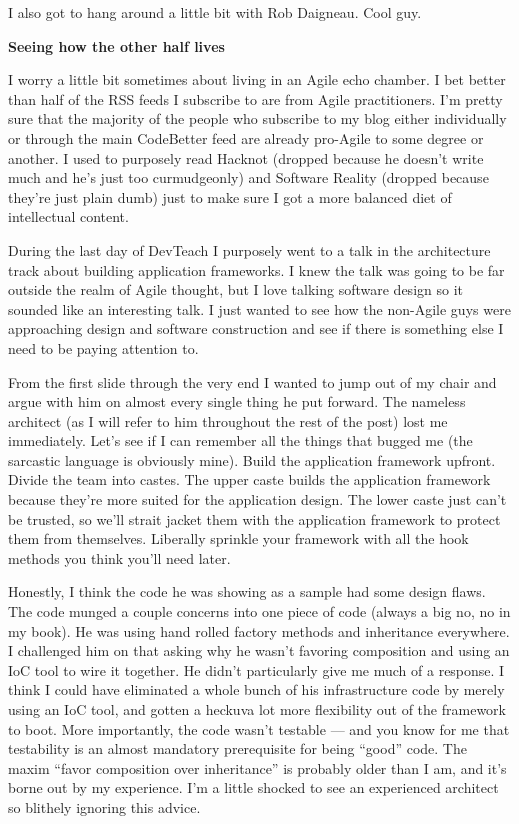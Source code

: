 \documentclass{article}
\begin{document}
I also got to hang around a little bit with Rob Daigneau.  Cool guy.

 
\Large {\textbf {Seeing how the other half lives}}

I worry a little bit sometimes about living in an Agile echo chamber.  I bet better than half of the RSS feeds I subscribe to are from Agile practitioners.  I'm pretty sure that the majority of the people who subscribe to my blog either individually or through the main CodeBetter feed are already pro-Agile to some degree or another.  I used to purposely read Hacknot (dropped because he doesn't write much and he's just too curmudgeonly) and Software Reality (dropped because they're just plain dumb) just to make sure I got a more balanced diet of intellectual content. 

During the last day of DevTeach I purposely went to a talk in the architecture track about building application frameworks.  I knew the talk was going to be far outside the realm of Agile thought, but I love talking software design so it sounded like an interesting talk.  I just wanted to see how the non-Agile guys were approaching design and software construction and see if there is something else I need to be paying attention to. 

From the first slide through the very end I wanted to jump out of my chair and argue with him on almost every single thing he put forward.  The nameless architect (as I will refer to him throughout the rest of the post) lost me immediately.  Let's see if I can remember all the things that bugged me (the sarcastic language is obviously mine).  Build the application framework upfront.  Divide the team into castes.  The upper caste builds the application framework because they're more suited for the application design.  The lower caste just can't be trusted, so we'll strait jacket them with the application framework to protect them from themselves.  Liberally sprinkle your framework with all the hook methods you think you'll need later. 

Honestly, I think the code he was showing as a sample had some design flaws.  The code munged a couple concerns into one piece of code (always a big no, no in my book).  He was using hand rolled factory methods and inheritance everywhere.  I challenged him on that asking why he wasn't favoring composition and using an IoC tool to wire it together.  He didn't particularly give me much of a response.  I think I could have eliminated a whole bunch of his infrastructure code by merely using an IoC tool, and gotten a heckuva lot more flexibility out of the framework to boot.  More importantly, the code wasn't testable — and you know for me that testability is an almost mandatory prerequisite for being “good” code.  The maxim “favor composition over inheritance” is probably older than I am, and it's borne out by my experience.  I'm a little shocked to see an experienced architect so blithely ignoring this advice. 
\end{document}
